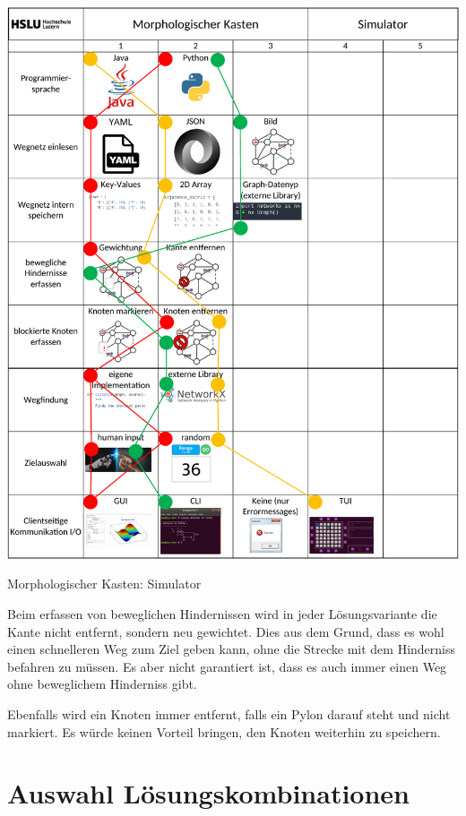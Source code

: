 \begin{table}[H]
\centering
\includegraphics[width=\textwidth]{assets/MK_Simulator.pdf}
\caption{Morphologischer Kasten: Simulator}
\label{table:mk-simulator}
\end{table}



Beim erfassen von beweglichen Hindernissen wird in jeder Lösungsvariante die Kante nicht entfernt, sondern neu gewichtet. Dies aus dem Grund, dass es wohl einen schnelleren Weg zum Ziel geben kann, ohne die Strecke mit dem Hinderniss befahren zu müssen. Es aber nicht garantiert ist, dass es auch immer einen Weg ohne beweglichem Hinderniss gibt.

Ebenfalls wird ein Knoten immer entfernt, falls ein Pylon darauf steht und nicht markiert. Es würde keinen Vorteil bringen, den Knoten weiterhin zu speichern.


\newpage
\section{Auswahl Lösungskombinationen}

